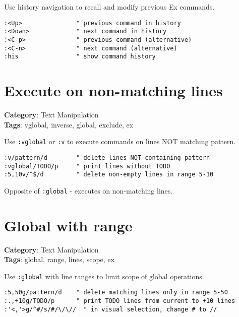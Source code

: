 {{{{{Use history navigation to recall and modify previous Ex commands.

\begin{Exa*}{}
\begin{Verbatim}[fontsize=\footnotesize, breaklines, breakanywhere]
:<Up>               " previous command in history
:<Down>             " next command in history
:<C-p>              " previous command (alternative)
:<C-n>              " next command (alternative)
:his                " show command history
\end{Verbatim}
\end{Exa*}

\section{Execute on non-matching lines}

\textbf{Category}: Text Manipulation\\ \textbf{Tags}: vglobal, inverse, global, exclude, ex
\vspace{0.5cm}

Use {\footnotesize \Verb§:vglobal§} or {\footnotesize \Verb§:v§} to execute commands on lines NOT matching pattern.

\begin{Exa*}{}
\begin{Verbatim}[fontsize=\footnotesize, breaklines, breakanywhere]
:v/pattern/d        " delete lines NOT containing pattern
:vglobal/TODO/p     " print lines without TODO
:5,10v/^$/d         " delete non-empty lines in range 5-10
\end{Verbatim}
\end{Exa*}

Opposite of {\footnotesize \Verb§:global§} - executes on non-matching lines.

\section{Global with range}

\textbf{Category}: Text Manipulation\\ \textbf{Tags}: global, range, lines, scope, ex
\vspace{0.5cm}

Use {\footnotesize \Verb§:global§} with line ranges to limit scope of global operations.

\begin{Exa*}{}
\begin{Verbatim}[fontsize=\footnotesize, breaklines, breakanywhere]
:5,50g/pattern/d    " delete matching lines only in range 5-50
:.,+10g/TODO/p      " print TODO lines from current to +10 lines
:'<,'>g/^#/s/#/\/\//  " in visual selection, change # to //
\end{Verbatim}
\end{Exa*}

}}}}}
